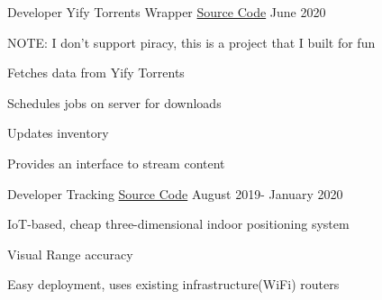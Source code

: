 \begin{cventries}
    \cventry
    {Developer}
    {Yify Torrents Wrapper}
    {\href{https://github.com/realaravinth/yts-wrapper}{Source Code}}
    {June 2020}
    {
        \begin{cvitems} %
            \item{NOTE: I don't support piracy, this is a project that I built for fun}
            \item {Fetches data from Yify Torrents}
            \item {Schedules jobs on server for downloads}
            \item {Updates inventory}
            \item {Provides an interface to stream content}
        \end{cvitems}
    }
    
    \cventry
    {Developer}
    {Tracking}
    {\href{https://github.com/realaravinth/tracking}{Source Code}}
    {August 2019- January 2020}
    {
        \begin{cvitems} %
        \item {IoT-based, cheap three-dimensional indoor positioning system}
        \item {Visual Range accuracy}
        \item {Easy deployment, uses existing infrastructure(WiFi) routers}
      \end{cvitems}
    }
    
  
\end{cventries}
